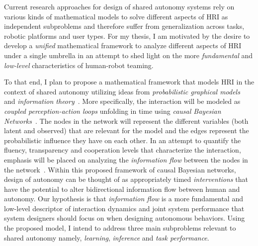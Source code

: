\documentclass[12pt]{article}
\newcommand{\DGc}[1]{{\textbf{\color{blue}{#1}}}}
\begin{document}
Current research approaches for design of shared autonomy systems rely on various kinds of mathematical models to solve different aspects of HRI as independent subproblems and therefore suffer from generalization across tasks, robotic platforms and user types. For my thesis, I am motivated by the desire to develop a \textit{unified} mathematical framework to analyze different aspects of HRI under a single umbrella in an attempt to shed light on the more \textit{fundamental} and \textit{low-level} characteristics of human-robot teaming.

To that end, I plan to propose a mathematical framework that models HRI in the context of shared autonomy utilizing ideas from \textit{probabilistic graphical models}~\cite{koller2009probabilistic} and \textit{information theory}~\cite{cover2012elements}. More specifically, the interaction will be modeled as \textit{coupled perception-action loops} unfolding in time using \textit{causal Bayesian Networks}~\cite{pearl2009causality}. The nodes in the network will represent the different variables (both latent and observed) that are relevant for the model and the edges represent the probabilistic influence they have on each other. In an attempt to quantify the fluency, transparency and cooperation levels that characterize the interaction, emphasis will be placed on analyzing the \textit{information flow} between the nodes in the network~\cite{ay2008information}. Within this proposed framework of causal Bayesian networks, design of autonomy can be thought of as appropriately timed \textit{interventions} that have the potential to alter bidirectional information flow between human and autonomy.
Our hypothesis is that \textit{information flow} is a more fundamental and low-level descriptor of interaction dynamics and joint system performance that system designers should focus on when designing autonomous behaviors.
Using the proposed model, I intend to address three main subproblems relevant to shared autonomy namely, \textit{learning}, \textit{inference} and \textit{task performance}.
\end{document}
